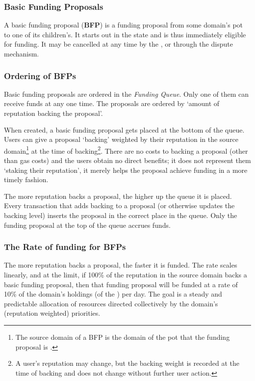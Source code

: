 %
%
%

\subsubsection{Basic Funding Proposals}\label{subsubsec:BFPs}
A basic funding proposal (\textbf{BFP}) is a funding proposal from some domain's pot to one of its children's. It starts out in the  state and is thus immediately eligible for funding. It may be cancelled at any time by the , or through the dispute mechanism.

\subsubsection*{Ordering of BFPs}
Basic funding proposals are ordered in the \emph{Funding Queue}. Only one of them can receive funds at any one time. The proposals are ordered by `amount of reputation backing the proposal'.

When created, a basic funding proposal gets placed at the bottom of the queue. Users can give a proposal `backing' weighted by their reputation in the source domain\footnote{The source domain of a BFP is the domain of the pot that the funding proposal is .} at the time of backing\footnote{A user's reputation may change, but the backing weight is recorded at the time of backing and does not change without further user action.}. There are no costs to backing a proposal (other than gas costs) and the users obtain no direct benefits; it does not represent them `staking their reputation', it merely helps the proposal achieve funding in a more timely fashion.

The more reputation backs a proposal, the higher up the queue it is placed. Every transaction that adds backing to a proposal (or otherwise updates the backing level) inserts the proposal in the correct place in the queue. Only the funding proposal at the top of the queue accrues funds.

\subsubsection*{The Rate of funding for BFPs}
The more reputation backs a proposal, the faster it is funded. The rate scales linearly, and at the limit, if 100\% of the reputation in the source domain backs a basic funding proposal, then that funding proposal will be funded at a rate of 10\% of the domain's holdings (of the ) per day.  The goal is a steady and predictable allocation of resources directed collectively by the domain's (reputation weighted) priorities.

